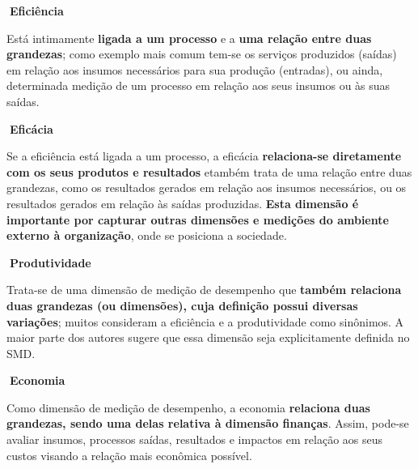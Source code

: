 \documentclass[
  letterpaper,
  DIV=11,
  numbers=noendperiod]{scrreprt}
\begin{document}
\begin{tcolorbox}[enhanced jigsaw, opacityback=0, toprule=.15mm, breakable, leftrule=.75mm, rightrule=.15mm, left=2mm, colback=white, arc=.35mm, bottomrule=.15mm]

\textbf{🔽{Eficiência}}\vspace{2mm}

Está intimamente \textbf{ligada a um processo} e a \textbf{uma relação
entre duas grandezas}; como exemplo mais comum tem-se os serviços
produzidos (saídas) em relação aos insumos necessários para sua produção
(entradas), ou ainda, determinada medição de um processo em relação aos
seus insumos ou às suas saídas.

\end{tcolorbox}

\begin{tcolorbox}[enhanced jigsaw, opacityback=0, toprule=.15mm, breakable, leftrule=.75mm, rightrule=.15mm, left=2mm, colback=white, arc=.35mm, bottomrule=.15mm]

\textbf{🔽{Eficácia}}\vspace{2mm}

Se a eficiência está ligada a um processo, a eficácia
\textbf{relaciona-se diretamente com os seus produtos e resultados}
etambém trata de uma relação entre duas grandezas, como os resultados
gerados em relação aos insumos necessários, ou os resultados gerados em
relação às saídas produzidas. \textbf{Esta dimensão é importante por
capturar outras dimensões e medições do ambiente externo à organização},
onde se posiciona a sociedade.

\end{tcolorbox}

\begin{tcolorbox}[enhanced jigsaw, opacityback=0, toprule=.15mm, breakable, leftrule=.75mm, rightrule=.15mm, left=2mm, colback=white, arc=.35mm, bottomrule=.15mm]

\textbf{🔽{Produtividade}}\vspace{2mm}

Trata-se de uma dimensão de medição de desempenho que \textbf{também
relaciona duas grandezas (ou dimensões), cuja definição possui diversas
variações}; muitos consideram a eficiência e a produtividade como
sinônimos. A maior parte dos autores sugere que essa dimensão seja
explicitamente definida no SMD.

\end{tcolorbox}

\begin{tcolorbox}[enhanced jigsaw, opacityback=0, toprule=.15mm, breakable, leftrule=.75mm, rightrule=.15mm, left=2mm, colback=white, arc=.35mm, bottomrule=.15mm]

\textbf{🔽{Economia}}\vspace{2mm}

Como dimensão de medição de desempenho, a economia \textbf{relaciona
duas grandezas, sendo uma delas relativa à dimensão finanças}. Assim,
pode-se avaliar insumos, processos saídas, resultados e impactos em
relação aos seus custos visando a relação mais econômica possível.

\end{tcolorbox}
\end{document}
